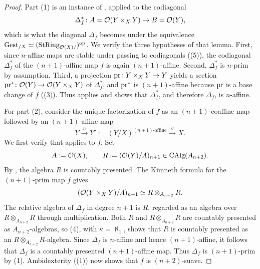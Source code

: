\documentclass[11pt]{book}
\begin{document}
	\begin{proof}
		Part (1) is an instance of , applied to the codiagonal
		\[
			\Delta_f^*\colon A = \mathcal{O}(Y \times_X Y) \to B = \mathcal{O}(Y),
		\]
		which is what the diagonal $\Delta_f$ becomes under the equivalence ${\textup{Gest}}_{/X} \simeq ({\textup{StRing}}_{\mathcal{O}(X)/})^{\textup{op}}$. We verify the three hypotheses of that lemma. First, since $n$-affine maps are stable under passing to codiagonals ((5)), the codiagonal $\Delta_f^*$ of the $(n+1)$-affine map $f$ is again $(n+1)$-affine. Second, $\Delta_f^*$ is $n$-prim by assumption. Third, a projection $\operatorname{pr}\colon Y \times_X Y \to Y$ yields a section $\operatorname{pr}^*\colon \mathcal{O}(Y) \to \mathcal{O}(Y \times_X Y)$ of $\Delta_f^*$, and $\operatorname{pr}^*$ is $(n+1)$-affine because $\operatorname{pr}$ is a base change of $f$ ((3)). Thus  applies and shows that $\Delta_f^*$, and therefore $\Delta_f$, is $n$-affine.

		For part (2), consider the unique factorization of $f$ as an $(n+1)$-coaffine map followed by an $(n+1)$-affine map
		\[
			Y \xrightarrow{h} Y' := (Y/X)^{(n+1)\text{-affine}} \xrightarrow{g} X.
		\]
		We first verify that  applies to $f$. Set
		\[
			A:=\mathcal{O}(X), \qquad R:=(\mathcal{O}(Y)/A)_{n+1}\in{\textup{CAlg}}(A_{n+2}).
		\]
		By , the algebra $R$ is countably presented. The K\"unneth formula for the $(n+1)$-prim map $f$ gives
		\[
			(\mathcal{O}(Y\times_XY)/A)_{n+1}\simeq R\otimes_{A_{n+2}}R.
		\]
		The relative algebra of $\Delta_f$ in degree $n+1$ is $R$, regarded as an algebra over $R\otimes_{A_{n+2}}R$ through multiplication. Both $R$ and $R\otimes_{A_{n+2}}R$ are countably presented as $A_{n+2}$-algebras, so (4), with $\kappa=\aleph_1$, shows that $R$ is countably presented as an $R\otimes_{A_{n+2}}R$-algebra. Since $\Delta_f$ is $n$-affine and hence $(n+1)$-affine, it follows that $\Delta_f$ is a countably presented $(n+1)$-affine map. Thus $\Delta_f$ is $(n+1)$-prim by (1). Ambidexterity ((1)) now shows that $f$ is $(n+2)$-suave.


\end{proof}
\end{document}
